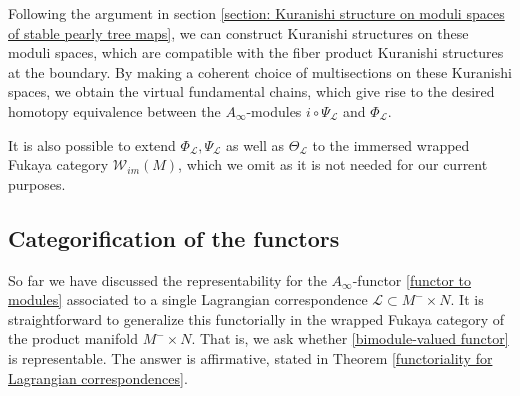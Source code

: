 \documentclass{amsart}
\numberwithin{equation}{section}
\numberwithin{figure}{section}
\begin{document}
	Following the argument in section \ref{section: Kuranishi structure on moduli spaces of stable pearly tree maps}, we can construct Kuranishi structures on these moduli spaces, which are compatible with the fiber product Kuranishi structures at the boundary. By making a coherent choice of multisections on these Kuranishi spaces, we obtain the virtual fundamental chains, which give rise to the desired homotopy equivalence between the $A_{\infty}$-modules $i \circ \Psi_{\mathcal{L}}$ and $\Phi_{\mathcal{L}}$. \par 

	It is also possible to extend $\Phi_{\mathcal{L}}, \Psi_{\mathcal{L}}$ as well as $\Theta_{\mathcal{L}}$ to the immersed wrapped Fukaya category $\mathcal{W}_{im}(M)$, which we omit as it is not needed for our current purposes. \par

\subsection{Categorification of the functors}
	So far we have discussed the representability for the $A_{\infty}$-functor \eqref{functor to modules} associated to a single Lagrangian correspondence $\mathcal{L} \subset M^{-} \times N$. It is straightforward to generalize this functorially in the wrapped Fukaya category of the product manifold $M^{-} \times N$. That is, we ask whether \eqref{bimodule-valued functor} is representable. The answer is affirmative, stated in Theorem \ref{functoriality for Lagrangian correspondences}. \par
\end{document}
